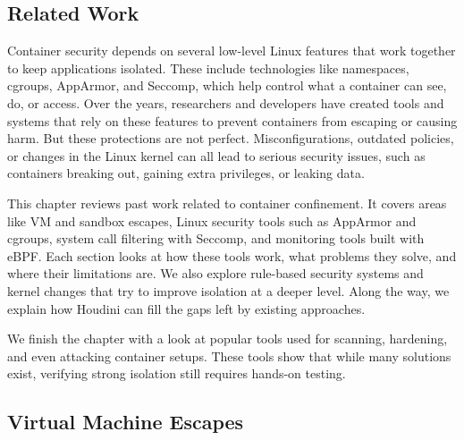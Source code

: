 \fontsize{12pt}{14pt} \selectfont
\begin{doublespace}
\chapter{Related Work}

Container security depends on several low-level Linux features that work together to keep applications isolated. These include technologies like namespaces, cgroups, AppArmor, and Seccomp, which help control what a container can see, do, or access. Over the years, researchers and developers have created tools and systems that rely on these features to prevent containers from escaping or causing harm. But these protections are not perfect. Misconfigurations, outdated policies, or changes in the Linux kernel can all lead to serious security issues, such as containers breaking out, gaining extra privileges, or leaking data.

This chapter reviews past work related to container confinement. It covers areas like VM and sandbox escapes, Linux security tools such as AppArmor and cgroups, system call filtering with Seccomp, and monitoring tools built with eBPF. Each section looks at how these tools work, what problems they solve, and where their limitations are. We also explore rule-based security systems and kernel changes that try to improve isolation at a deeper level. Along the way, we explain how Houdini can fill the gaps left by existing approaches.

We finish the chapter with a look at popular tools used for scanning, hardening, and even attacking container setups. These tools show that while many solutions exist, verifying strong isolation still requires hands-on testing.

\section{Virtual Machine Escapes} 


\end{doublespace}
